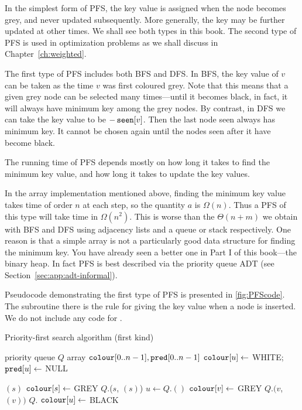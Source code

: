 In the simplest form of PFS, the key value is assigned when the node
becomes grey, and never updated subsequently. More generally, the key
may be further updated at other times. We shall see both types in this
book. The second type of PFS is used in optimization problems as we
shall discuss in Chapter~\ref{ch:weighted}. 

The first type of PFS includes both BFS and DFS. In BFS, the key
value of $v$ can be taken as the time $v$ was first coloured grey.
Note that this means that a given grey node can be selected many
times---until it becomes black, in fact, it will always have minimum
key among the grey nodes. By contrast, in DFS we can take the key
value to be $-\seen[v]$. Then the last node seen always has minimum
key. It cannot be chosen again until the nodes seen after it have
become black.

The running time of PFS depends mostly on how long it takes to find the
minimum key value, and how long it takes to update the key values.

In the array implementation mentioned above, finding the minimum key
value takes time of order $n$ at each step, so the quantity $a$ is
$\Omega(n)$. Thus a PFS of this type will take time in $\Omega(n^2)$.
This is worse than the $\Theta(n+m)$ we obtain with BFS and DFS using
adjacency lists and a queue or stack respectively. One reason is that a
simple array is not a particularly good data structure for finding the
minimum key. You have already seen a better one in Part I of this 
book---the binary heap. In fact PFS is best described via the priority
queue ADT (see Section~\ref{sec:app:adt-informal}).

Pseudocode demonstrating the first type of PFS is presented in
\cref{fig:PFScode}. The subroutine  there is the
rule for giving the key value when a node is inserted. We do not include
any code for .

\begin{algorithm}[H]
  \caption{Priority-first search algorithm (first kind)}
  \label{fig:PFScode}
\begin{algorithmic}[1]
	\State priority queue $Q$  
	\State array $\colour[0..n-1], \pred[0..n-1]$
		\State $\colour[u] \gets $ WHITE; $\pred[u] \gets $ NULL
	\EndFor
	
			\State {}$(s)$
		\EndIf
	\EndFor
	\State \Return{$\pred$}
\EndFunction
{}
	\State $\colour[s] \gets $ GREY 
	\State $Q$.($s$, $(s)$)
		\State $u \gets Q$.$()$
			\State $\colour[v] \gets $ GREY
			\State $Q$.$(v$,  $(v))$
		\Else
			\State $Q$.
			\State $\colour[u] \gets$ BLACK
		\EndIf
	\EndWhile
\EndFunction
\end{algorithmic}
\end{algorithm}


